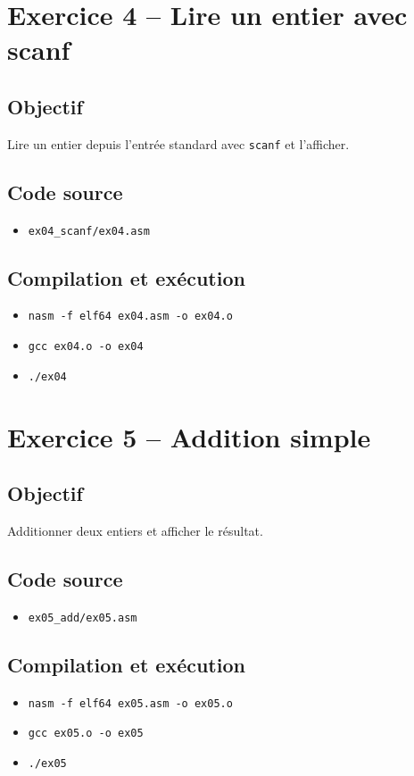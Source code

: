 \documentclass[11pt]{article}
\begin{document}
\section{Exercice 4 -- Lire un entier avec scanf}
\subsection*{Objectif}
Lire un entier depuis l'entrée standard avec \texttt{scanf} et l'afficher.

\subsection*{Code source}
\begin{itemize}[noitemsep]
    \item \texttt{ex04\_scanf/ex04.asm}
\end{itemize}

\subsection*{Compilation et exécution}
\begin{itemize}[noitemsep]
    \item \texttt{nasm -f elf64 ex04.asm -o ex04.o}
    \item \texttt{gcc ex04.o -o ex04}
    \item \texttt{./ex04}
\end{itemize}

\section{Exercice 5 -- Addition simple}
\subsection*{Objectif}
Additionner deux entiers et afficher le résultat.

\subsection*{Code source}
\begin{itemize}[noitemsep]
    \item \texttt{ex05\_add/ex05.asm}
\end{itemize}

\subsection*{Compilation et exécution}
\begin{itemize}[noitemsep]
    \item \texttt{nasm -f elf64 ex05.asm -o ex05.o}
    \item \texttt{gcc ex05.o -o ex05}
    \item \texttt{./ex05}
\end{itemize}
\end{document}
